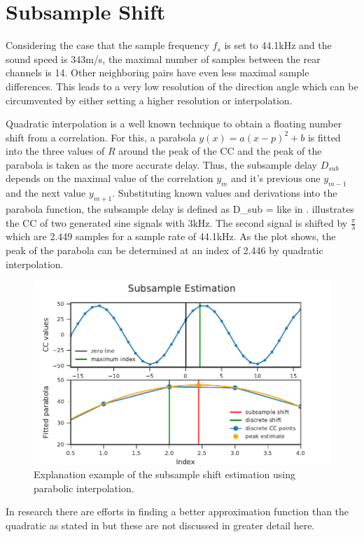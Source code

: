 \section{Subsample Shift}
\label{sec:02_subsampleShift}

Considering the case that the sample frequency $f_s$ is set to 44.1\si{\kilo\hertz}
and the sound speed is 343\si{m/s}, the maximal number of samples
between the rear channels is 14.
Other neighboring pairs have even less maximal sample differences.
This leads to a very low resolution of the direction angle which can be
circumvented by either setting a higher resolution or interpolation.

Quadratic interpolation is a well known technique to obtain a floating number
shift from a correlation.
For this, a parabola $y(x) = a(x-p)^2+b$ is fitted into the three values of $R$ around the peak
of the \ac{CC} and the peak of the parabola is taken as the more accurate
delay.
Thus, the subsample delay $D_{sub}$ depends on the maximal value of the correlation $y_m$
and it's previous one $y_{m-1}$ and the next value $y_{m+1}$.
Substituting known values and derivations into the parabola function,
the subsample delay is defined as
\bal
	D_{sub} = 
	\label{eq:02_subsample}
\eal
like in \cite{C_H_subsampleDelay}.
 illustrates the \ac{CC} of two generated sine signals with 3\si{\kilo\hertz}.
The second signal is shifted by $\frac{\pi}{3}$ which are 2.449 samples for a sample rate
of 44.1kHz.
As the plot shows, the peak of the parabola can be determined at an index of 2.446 by
quadratic interpolation.
\begin{figure}[ht]
	\centering
		\includegraphics[]{figures/subsample_shift}
	\caption{Explanation example of the subsample shift estimation using parabolic interpolation.}
    \label{fig:02_subsampleShift}
\end{figure}
In research there are efforts in finding a better approximation function than the quadratic as stated
in \cite{S_L_subsampleInterpolation} but these are not discussed in greater detail here.
